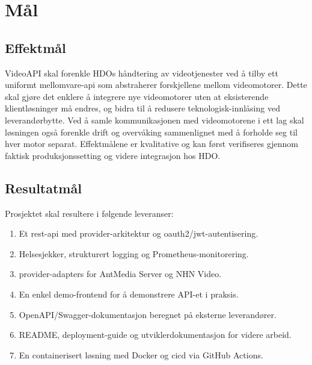 \section{Mål}
\label{sec:maal}

\subsection{Effektmål}
VideoAPI skal forenkle HDOs håndtering av videotjenester ved å tilby ett uniformt \gls{mellomvare}-\gls{api} som abstraherer forskjellene mellom videomotorer. Dette skal gjøre det enklere å integrere nye videomotorer uten at eksisterende klientløsninger må endres, og bidra til å redusere \gls{teknologisk-innlåsing} ved leverandørbytte. Ved å samle kommunikasjonen med videomotorene i ett lag skal løsningen også forenkle drift og overvåking sammenlignet med å forholde seg til hver motor separat. Effektmålene er kvalitative og kan først verifiseres gjennom faktisk produksjonssetting og videre integrasjon hos HDO.


\subsection{Resultatmål}
Prosjektet skal resultere i følgende leveranser:
\begin{enumerate}
  \item Et \gls{rest-api} med provider-arkitektur og \gls{oauth2}/\gls{jwt}-autentisering.
  \item Helsesjekker, strukturert logging og Prometheus-monitorering.
  \item \Glspl{provider-adapter} for AntMedia Server og NHN Video.
  \item En enkel \gls{demo-frontend} for å demonstrere API-et i praksis.
  \item OpenAPI/Swagger-dokumentasjon beregnet på eksterne leverandører.
  \item README, deployment-guide og utviklerdokumentasjon for videre arbeid.
  \item En containerisert løsning med Docker og \gls{cicd} via GitHub Actions.
\end{enumerate}

